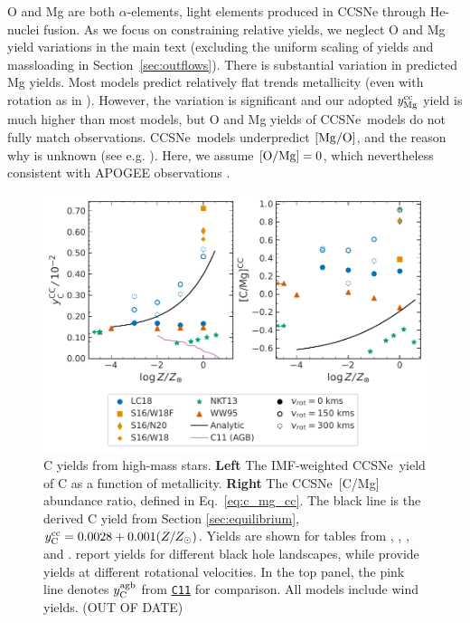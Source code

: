 \documentclass[fleqn,usenatbib]{mnras}
\newcommand{\cxi}{\texttt{\hyperlink{C11}{C11}}}
\newcommand{\apogee}{APOGEE}
\newcommand{\cc}{CCSNe}
\newcommand{\imf}{IMF}
\newcommand{\Ycc}{\ensuremath{y_{\rm C}^{\rm cc}}}
\newcommand{\Yoc}{\ensuremath{y_{\rm Mg}^{\rm cc}}}
\newcommand{\Ycagb}{\ensuremath{y_{\rm C}^{\rm agb}}}
\begin{document}
O and Mg are both $\alpha$-elements, light elements produced in \cc{} through He-nuclei fusion. 
As we focus on constraining relative yields, we neglect O and Mg yield variations in the main text (excluding the uniform scaling of yields and massloading in Section~\ref{sec:outflows}). There is substantial variation in predicted Mg yields. 
Most models predict relatively flat trends metallicity (even with rotation as in \citealt{LC18}). 
However, the variation is significant and our adopted $\Yoc$ yield is much higher than most models, but O and Mg yields of \cc\ models do not fully match observations. \cc\ models underpredict $[{\rm Mg}/{\rm O}]$, and the reason why is unknown (see e.g. \citealt{emily+21}). Here, we assume ${\rm [O/Mg]} = 0$, which nevertheless consistent with \apogee{} observations \citep{weinberg+19, weinberg+22}.
    

\begin{figure}
    \centering
    \includegraphics{cc_yields.pdf}
    \caption[High-Mass Star Carbon Yields]{
        C yields from high-mass stars.
        \textbf{Left} The \imf-weighted \cc\ yield of C as a function of metallicity.
        \textbf{Right} The \cc\ [C/Mg] abundance ratio, defined in Eq.~\ref{eq:c_mg_cc}. The black line is the derived C yield from Section \ref{sec:equilibrium},
    $\Ycc = 0.0028 + 0.001 (Z/Z_{\odot})$. Yields are shown for tables from 
    \citet[red triangles]{WW95}, \citet[orange squares and diamonds]{sukhbold+16}, 
    \citet[green stars]{NKT13}, and \citet[blue circles]{LC18}. \citet{sukhbold+16} report yields for different black hole landscapes, while \citet{LC18} provide yields at different rotational velocities.
    In the top panel, the pink line denotes $\Ycagb$ from \cxi{} for comparison. All models include wind yields. 
    (OUT OF DATE)
}
    \label{fig:y_cc}
\end{figure}
\end{document}
